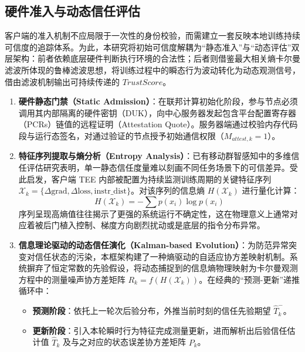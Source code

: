 \documentclass[11pt, a4paper, UTF8, fontset=fandol]{ctexart}
\begin{document}
\subsection{硬件准入与动态信任评估}
客户端的准入机制不应局限于一次性的身份校验，而需建立一套反映本地训练持续可信度的追踪体系。为此，本研究将初始可信度解耦为“静态准入”与“动态评估”双层架构：前者依赖底层硬件判断执行环境的合法性；后者则借鉴最大相关熵卡尔曼滤波所体现的鲁棒滤波思想\cite{chen2017maximum}，将训练过程中的瞬态行为波动转化为动态观测信号，借由滤波机制输出可持续传递的 $TrustScore$。

\begin{enumerate}
    \item \textbf{硬件静态门禁（Static Admission）}：在联邦计算初始化阶段，参与节点必须调用其内部隔离的硬件密钥（DUK），向中心服务器发起包含平台配置寄存器（PCRs）链值的远程证明（Attestation Quote）。服务器端通过校验内存代码段与运行态签名，对通过验证的节点授予初始通信权限（$M_{attest,k}=1$）。
    \item \textbf{特征序列提取与熵分析（Entropy Analysis）}：已有移动群智感知中的多维信任评估研究表明，单一静态信任度量难以刻画不同任务场景下的可信差异\cite{li2026multidimensional}。受此启发，客户端 TEE 内部被配置为持续监测训练周期的关键特征序列 $\mathcal{X}_k = \{ \Delta \text{grad}, \Delta \text{loss}, \text{instr\_dist} \}$。对该序列的信息熵 $H(\mathcal{X}_k)$ 进行量化计算：
          \begin{equation}
              H(\mathcal{X}_k) = -\sum p(x_i) \log p(x_i)
          \end{equation}
          序列呈现高熵值往往揭示了更强的系统运行不确定性，这在物理意义上通常对应着被后门植入控制、梯度方向剧烈扰动或是底层的指令分布异常。
    \item \textbf{信息理论驱动的动态信任演化（Kalman-based Evolution）}：为防范异常突变对信任状态的污染，本框架构建了一种熵驱动的自适应协方差映射机制。系统摒弃了恒定常数的先验假设，将动态捕捉到的信息熵物理映射为卡尔曼观测方程中的测量噪声协方差矩阵 $R_k = f(H(\mathcal{X}_k))$。在经典的“预测-更新”递推循环中：
          \begin{itemize}
              \item \textbf{预测阶段}：依托上一轮次后验分布，外推当前时刻的信任先验期望 $\hat{T}_k^-$。
              \item \textbf{更新阶段}：引入本轮瞬时行为特征完成测量更新，进而解析出后验信任估计值 $\hat{T}_k$ 及与之对应的状态误差协方差矩阵 $P_k$。
          \end{itemize}
\end{enumerate}
\end{document}
